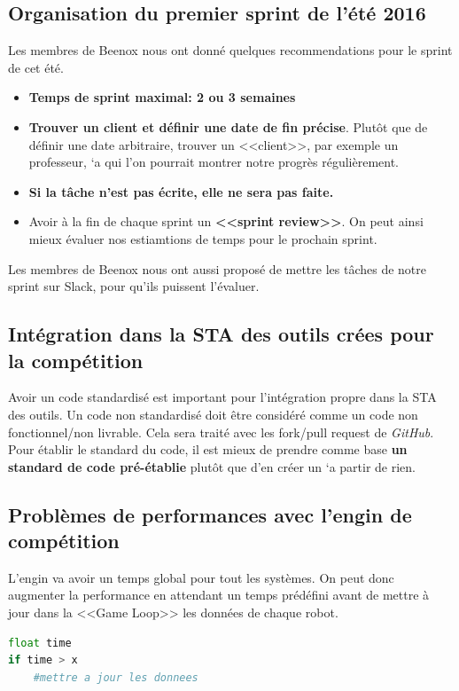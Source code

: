 \documentclass[12pt,letterpaper,twoside]{article}
\begin{document}
\subsection*{Organisation du premier sprint de l'été 2016}
Les membres de Beenox nous ont donné quelques recommendations pour le sprint de cet été. 
\begin{itemize}
\item \textbf{Temps de sprint maximal: 2 ou 3 semaines}
\item \textbf{Trouver un client et définir une date de fin précise}. 
Plut\^ot que de définir une date arbitraire, trouver un <<client>>, par exemple un professeur, `a qui l'on pourrait montrer notre progr\`es régulièrement.
\item \textbf{Si la tâche n'est pas écrite, elle ne sera pas faite.}
\item Avoir à la fin de chaque sprint un \textbf{<<sprint review>>}.
On peut ainsi mieux évaluer nos estiamtions de temps pour le prochain sprint.
\end{itemize}
Les membres de Beenox nous ont aussi proposé de mettre les tâches de notre sprint sur Slack, pour qu'ils puissent l'évaluer.

\subsection*{Intégration dans la STA des outils crées pour la compétition}
Avoir un code standardisé est important pour l'intégration propre dans la STA des outils.
Un code non standardisé doit \^etre considéré comme un code non fonctionnel/non livrable.
Cela sera traité avec les fork/pull request de \textit{GitHub}.
\\
Pour établir le standard du code, il est mieux de prendre comme base \textbf{un standard de code pré-établie} plut\^ot que d'en créer un `a partir de rien.

\subsection*{Probl\`emes de performances avec l'engin de compétition}
L'engin va avoir un temps global pour tout les systèmes. 
On peut donc augmenter la performance en attendant un temps prédéfini avant de mettre à jour dans la <<Game Loop>> les données de chaque robot.

\begin{lstlisting}[language = python]
float time
if time > x
	#mettre a jour les donnees
\end{lstlisting}
\end{document}
